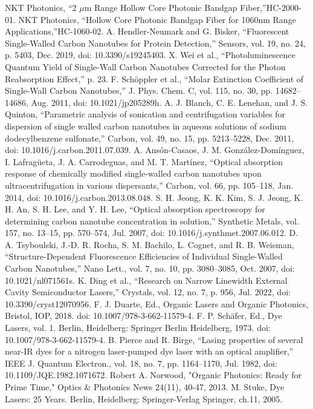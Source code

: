 \begin{thebibliography}{99}
NKT Photonics, “2 $\mu$m Range Hollow Core Photonic Bandgap Fiber,”HC-2000-01.
NKT Photonics, “Hollow Core Photonic Bandgap Fiber for 1060nm Range Applications,”HC-1060-02.
A. Hendler-Neumark and G. Bisker, “Fluorescent Single-Walled Carbon Nanotubes for Protein Detection,” Sensors, vol. 19, no. 24, p. 5403, Dec. 2019, doi: 10.3390/s19245403.
 X. Wei et al., “Photoluminescence Quantum Yield of Single-Wall Carbon Nanotubes Corrected for the Photon Reabsorption Effect,” p. 23.
 F. Schöppler et al., “Molar Extinction Coefficient of Single-Wall Carbon Nanotubes,” J. Phys. Chem. C, vol. 115, no. 30, pp. 14682–14686, Aug. 2011, doi: 10.1021/jp205289h.
 A. J. Blanch, C. E. Lenehan, and J. S. Quinton, “Parametric analysis of sonication and centrifugation variables for dispersion of single walled carbon nanotubes in aqueous solutions of sodium dodecylbenzene sulfonate,” Carbon, vol. 49, no. 15, pp. 5213–5228, Dec. 2011, doi: 10.1016/j.carbon.2011.07.039.
 A. Ansón-Casaos, J. M. González-Domínguez, I. Lafragüeta, J. A. Carrodeguas, and M. T. Martínez, “Optical absorption response of chemically modified single-walled carbon nanotubes upon ultracentrifugation in various dispersants,” Carbon, vol. 66, pp. 105–118, Jan. 2014, doi: 10.1016/j.carbon.2013.08.048.
S. H. Jeong, K. K. Kim, S. J. Jeong, K. H. An, S. H. Lee, and Y. H. Lee, “Optical absorption spectroscopy for determining carbon nanotube concentration in solution,” Synthetic Metals, vol. 157, no. 13–15, pp. 570–574, Jul. 2007, doi: 10.1016/j.synthmet.2007.06.012.
 D. A. Tsyboulski, J.-D. R. Rocha, S. M. Bachilo, L. Cognet, and R. B. Weisman, “Structure-Dependent Fluorescence Efficiencies of Individual Single-Walled Carbon Nanotubes,” Nano Lett., vol. 7, no. 10, pp. 3080–3085, Oct. 2007, doi: 10.1021/nl071561s.
K. Ding et al., “Research on Narrow Linewidth External Cavity Semiconductor Lasers,” Crystals, vol. 12, no. 7, p. 956, Jul. 2022, doi: 10.3390/cryst12070956.
 F. J. Duarte, Ed., Organic Lasers and Organic Photonics, Bristol, IOP, 2018. doi: 10.1007/978-3-662-11579-4.
F. P. Schäfer, Ed., Dye Lasers, vol. 1. Berlin, Heidelberg: Springer Berlin Heidelberg, 1973. doi: 10.1007/978-3-662-11579-4.
B. Pierce and R. Birge, “Lasing properties of several near-IR dyes for a nitrogen laser-pumped dye laser with an optical amplifier,” IEEE J. Quantum Electron., vol. 18, no. 7, pp. 1164–1170, Jul. 1982, doi: 10.1109/JQE.1982.1071672.
 Robert A. Norwood, "Organic Photonics: Ready for Prime Time," Optics \& Photonics News 24(11), 40-47, 2013.
M. Stuke, Dye Lasers: 25 Years. Berlin, Heidelberg: Springer-Verlag Springer, ch.11, 2005. 

\end{thebibliography}
